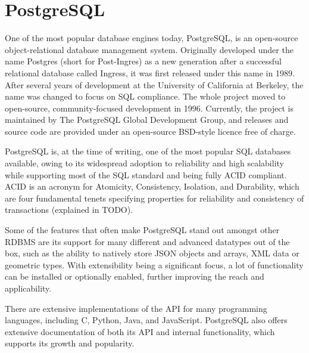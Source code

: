 \section{PostgreSQL}
One of the most popular database engines today, PostgreSQL, is an open-source object-relational database management system. Originally developed under the name Postgres (short for Post-Ingres) as a new generation after a successful relational database called Ingress, it was first released under this name in 1989. After several years of development at the University of California at Berkeley, the name was changed to focus on SQL compliance. The whole project moved to open-source, community-focused development in 1996. Currently, the project is maintained by The PostgreSQL Global Development Group, and releases and source code are provided under an open-source BSD-style licence free of charge.\par
PostgreSQL is, at the time of writing, one of the most popular SQL databases available, owing to its widespread adoption to reliability and high scalability while supporting most of the SQL standard and being fully ACID compliant. ACID is an acronym for Atomicity, Consistency, Isolation, and Durability, which are four fundamental tenets specifying properties for reliability and consistency of transactions (explained in TODO).\par
Some of the features that often make PostgreSQL stand out amongst other RDBMS are its support for many different and advanced datatypes out of the box, such as the ability to natively store JSON objects and arrays, XML data or geometric types. With extensibility being a significant focus, a lot of functionality can be installed or optionally enabled, further improving the reach and applicability.\par
There are extensive implementations of the API for many programming languages, including C, Python, Java, and JavaScript. PostgreSQL also offers extensive documentation of both its API and internal functionality, which supports its growth and popularity.\par

